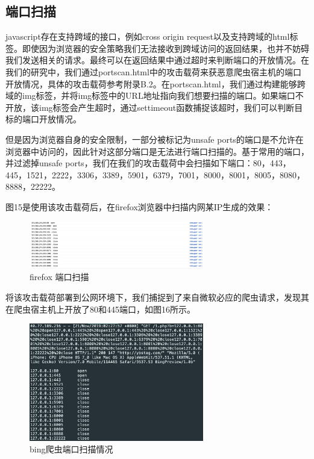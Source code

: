 \documentclass[doctor,privacy,twoside]{buaa_mac}
\begin{document}
\subsection{端口扫描}
javascript存在支持跨域的接口，例如cross origin request以及支持跨域的html标签。即使因为浏览器的安全策略我们无法接收到跨域访问的返回结果，也并不妨碍我们发送相关的请求。最终可以在返回结果中通过超时来判断端口的开放情况。在我们的研究中，我们通过portscan.html中的攻击载荷来获恶意爬虫宿主机的端口开放情况，具体的攻击载荷参考附录B.2。在portscan.html，我们通过构建能够跨域的img标签，并将img标签中的URL地址指向我们想要扫描的端口。如果端口不开放，该img标签会产生超时，通过settimeout函数捕捉该超时，我们可以判断目标的端口开放情况。

但是因为浏览器自身的安全限制，一部分被标记为unsafe ports的端口是不允许在浏览器中访问的，因此针对这部分端口是无法进行端口扫描的。基于常用的端口，并过滤掉unsafe ports，我们在我们的攻击载荷中会扫描如下端口：80，443，445，1521，2222，3306，3389，5901，6379，7001，8000，8001，8005，8080，8888，22222。

图15是使用该攻击载荷后，在firefox浏览器中扫描内网某IP生成的效果：
\centerline{}
\begin{figure}[!h]
  \centering
  \includegraphics[width=0.68\textwidth]{images/portscan.png}
  \caption{firefox 端口扫描}
  \label{fig:logo}
\end{figure}
\centerline{}

将该攻击载荷部署到公网环境下，我们捕捉到了来自微软必应的爬虫请求，发现其在爬虫宿主机上开放了80和445端口，如图16所示。
\centerline{}
\begin{figure}[!h]
  \centering
  \includegraphics[width=0.68\textwidth]{images/bing_crawler_portscan.png}
  \caption{bing爬虫端口扫描情况}
  \label{fig:logo}
\end{figure}
\centerline{}
\end{document}
